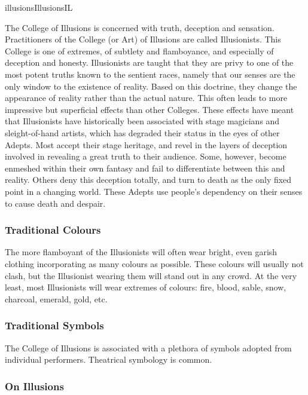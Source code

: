 \begin{College}[1.5]{illusions}{Illusions}{IL}

The College of Illusions is concerned with truth, deception and
sensation.  Practitioners of the College (or Art) of Illusions are
called Illusionists.  This College is one of extremes, of subtlety and
flamboyance, and especially of deception and honesty.  Illusionists
are taught that they are privy to one of the most potent truths known
to the sentient races, namely that our senses are the only window to
the existence of reality.  Based on this doctrine, they change the
appearance of reality rather than the actual nature.  This often leads
to more impressive but superficial effects than other Colleges. These
effects have meant that Illusionists have historically been associated
with stage magicians and sleight-of-hand artists, which has degraded
their status in the eyes of other Adepts.  Most accept their stage
heritage, and revel in the layers of deception involved in revealing a
great truth to their audience.  Some, however, become enmeshed within
their own fantasy and fail to differentiate between this and reality.
Others deny this deception totally, and turn to death as the only
fixed point in a changing world. These Adepts use people’s dependency
on their senses to cause death and despair.

\subsubsection{Traditional Colours}

The more flamboyant of the Illusionists will often wear bright, even
garish clothing incorporating as many colours as possible.  These
colours will usually not clash, but the Illusionist wearing them
will stand out in any crowd.  At the very least, most Illusionists
will wear extremes of colours: fire, blood, sable, snow, charcoal,
emerald, gold, etc.

\subsubsection{Traditional Symbols}

The College of Illusions is associated with a plethora of symbols
adopted from individual performers. Theatrical symbology is common.

\subsubsection{On Illusions}


\end{College}
